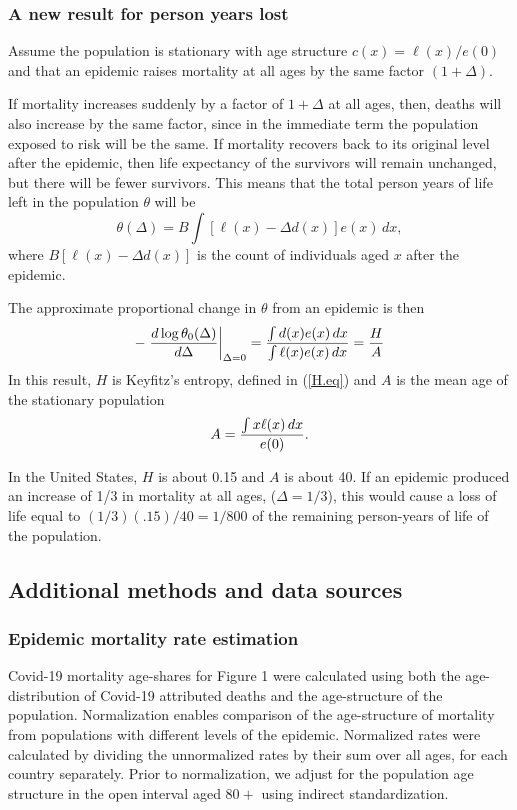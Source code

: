 \documentclass[9pt,twocolumn,twoside,lineno]{pnas-new}
\begin{document}
{\subsubsection*{A new result for person years lost}

\label{sec:pyl}
Assume the population is stationary with age structure $c(x) = \ell(x)
/ e(0)$ and that an epidemic raises mortality at all ages by the same
factor $(1 + \Delta)$.

If mortality increases suddenly by a factor of $1 + \Delta$ at all
ages, then, deaths will also increase by the same factor, since in the
immediate term the population exposed to risk will be the same. If
mortality recovers  back to its original level after the epidemic,
then life expectancy of the survivors will remain unchanged, but there
will be fewer survivors.  This means that the total person years of
life left in the population $\theta$ will be 
$$
\theta(\Delta) = B \int \left[\ell(x) - \Delta d(x)\right] e(x) \, dx,
$$
where $B\left[\ell(x) -\Delta d(x)\right]$ is the count of individuals
aged $x$ after the epidemic.

The approximate proportional change in $\theta$ from an epidemic is
then 
$$
-\left.{d \log \theta_0(\Delta) \over d \Delta}\right|_{\Delta = 0} =  
{\int d(x) e(x) \, dx \over \int \ell(x) e(x) \, dx} = {H \over A}
$$
In this result, $H$ is Keyfitz's entropy, defined in (\ref{H.eq}) 
and $A$ is the mean age of the stationary population
$$
A = {\int x \ell(x)\,dx \over e(0)}.
$$

In the United States, $H$ is about 0.15 and $A$ is about 40. If an
epidemic produced an increase of 1/3 in mortality at all ages, 
($\Delta = 1/3$), this would cause a loss of life equal
to $(1/3)(.15)/40 = 1/800$ of the remaining person-years of life of
the population.


\subsection*{Additional methods and data sources}
\subsubsection*{Epidemic mortality rate estimation}
\label{sec:rate}
Covid-19 mortality age-shares for Figure 1 were
calculated using both the age-distribution of Covid-19 attributed
deaths and the age-structure of the population.  Normalization enables
comparison of the age-structure of mortality from populations with
different levels of the epidemic. Normalized rates were calculated by
dividing the unnormalized rates by their sum over all ages, for each
country separately.  Prior to normalization, we adjust for the
population age structure in the open interval aged $80+$ using
indirect standardization.

}
\end{document}
